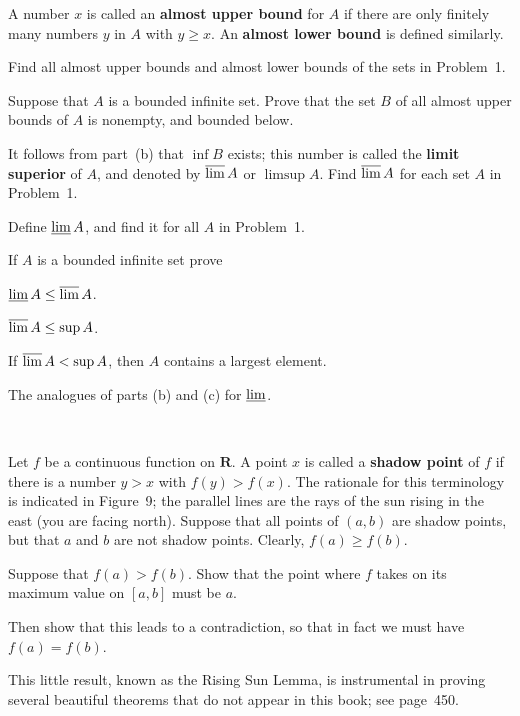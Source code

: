  A number $x$ is called an \textbf{almost upper bound} for $A$ if
there are only finitely many numbers $y$ in $A$ with $y \geq x$. An
\textbf{almost lower bound} is defined similarly.
\begin{letters}
\item Find all almost upper bounds and almost lower bounds of the sets in
  Problem~1.
\item Suppose that $A$ is a bounded infinite set. Prove that the set $B$ of
  all almost upper bounds of $A$ is nonempty, and bounded below.
\item It follows from part~(b) that $\inf B$ exists; this number is called
  the \textbf{limit superior} of $A$, and denoted by $\varlimsup A$ or
  $\limsup A$. Find $\varlimsup A$ for each set $A$ in Problem~1.
\item Define $\varliminf A$, and find it for all $A$ in Problem~1.
\end{letters}

 If $A$ is a bounded infinite set prove
\begin{letters}
\item $\varliminf A \leq \varlimsup A$.
\item $\varlimsup A \leq \sup A$.
\item If $\varlimsup A < \sup A$, then $A$ contains a largest element.
\item The analogues of parts (b) and (c) for $\varliminf$.
\end{letters}

\begin{center}
\\[0.6em]
\end{center}
 Let $f$ be a continuous function on $\mathbf{R}$. A point $x$ is
called a \textbf{shadow point} of $f$ if there is a number $y > x$ with
$f(y) > f(x)$. The rationale for this terminology is indicated in Figure~9;
the parallel lines are the rays of the sun rising in the east (you are facing
north). Suppose that all points of $(a,b)$ are shadow points, but that $a$
and $b$ are not shadow points. Clearly, $f(a) \geq f(b)$.
\begin{letters}
\item Suppose that $f(a) > f(b)$. Show that the point where $f$ takes on its
  maximum value on $[a,b]$ must be $a$.
\item Then show that this leads to a contradiction, so that in fact we must
  have $f(a) = f(b)$.
\end{letters}
This little result, known as the Rising Sun Lemma, is instrumental in proving
several beautiful theorems that do not appear in this book; see page~450.

